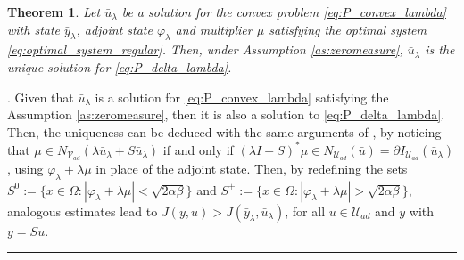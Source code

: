 \documentclass[11pt,a4paper]{amsart}
\newcommand{\kw}{\rule{2mm}{2mm}}
\newcommand{\om}{\Omega}
\renewenvironment{proof}{{Proof.}}{\hfill\kw}
\newtheorem{theorem}{{Theorem}}
\begin{document}
\begin{theorem}
         Let $\bar u_{\lambda}$ be a solution for the convex problem \eqref{eq:P_convex_lambda}  with state $\bar y_{\lambda}$, adjoint state $\varphi_{\lambda}$ and multiplier ${\mu}$ satisfying the optimal system \eqref{eq:optimal_system_regular}. Then, under Assumption \ref{as:zeromeasure}, $\bar u_\lambda$ is the unique solution for \eqref{eq:P_delta_lambda}.
\end{theorem}
 \begin{proof}.
Given that $\bar u_{\lambda}$ is a solution for \eqref{eq:P_convex_lambda} satisfying the Assumption \ref{as:zeromeasure}, then it is also a solution to \eqref{eq:P_delta_lambda}. Then, the uniqueness can be deduced with the same arguments of \cite[Theorem 2.11 ]{itokun2014}, by noticing that $\mu \in N_{\mathcal{V}_{ad}}( \lambda \bar u_{\lambda} + S \bar u_\lambda)$ if and only if $(\lambda I+S)^*\mu \in  N_{\mathcal{U}_{ad}}( \bar u) = \partial I_{\mathcal{U}_{ad}}(\bar u_\lambda)$, using $\varphi_\lambda +\lambda \mu$ in place of the adjoint state. Then, by redefining the sets $S^{0}:=\{x\in \om: |\varphi_{\lambda}+\lambda \mu|<\sqrt{2\alpha\beta}\}$ and $S^{+}:=\{x\in \om: |\varphi_{\lambda}+\lambda \mu|>\sqrt{2\alpha\beta}\}$, analogous estimates lead to $J(y,u)>J(\bar y_\lambda, \bar u_\lambda)$, for all $u\in \mathcal{U}_{ad}$ and $y$ with $y=Su$.  


\end{proof}
\end{document}
